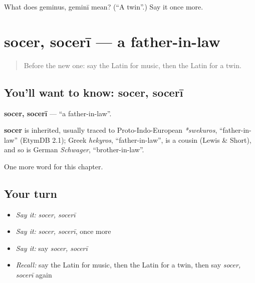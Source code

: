 \begin{tcolorbox}[breakable,colback=teal!4,colframe=teal!35!black,title={Before you move on}]
What does geminus, geminī mean? (\textquotedblleft{}A twin\textquotedblright{}.) Say it once more.
\end{tcolorbox}
\section[socer, socerī]{socer, socerī — a father-in-law}

\label{lesson:LA-C247-socer}



\begin{quote}
Before the new one: say the Latin for music, then the Latin for a twin.
\end{quote}

\subsection*{You'll want to know: socer, socerī}
\textbf{socer, socerī} — \textquotedblleft{}a father-in-law\textquotedblright{}.

\begin{cousinweb}
\textbf{socer} is inherited, usually traced to Proto-Indo-European \emph{*swekuros}, \textquotedblleft{}father-in-law\textquotedblright{} (EtymDB 2.1); Greek \emph{hekyros}, \textquotedblleft{}father-in-law\textquotedblright{}, is a cousin (Lewis \& Short), and so is German \emph{Schwager}, \textquotedblleft{}brother-in-law\textquotedblright{}.
\end{cousinweb}

\begin{grammarlens}[title={What you've built}]
One more word for this chapter.
\end{grammarlens}

\subsection*{Your turn}
\begin{itemize}
\raggedright
  \item \emph{Say it:} \emph{socer, socerī}
  \item \emph{Say it:} \emph{socer, socerī}, once more
  \item \emph{Say it:} say \emph{socer, socerī}
  \item \emph{Recall:} say the Latin for music, then the Latin for a twin, then say \emph{socer, socerī} again
\end{itemize}

